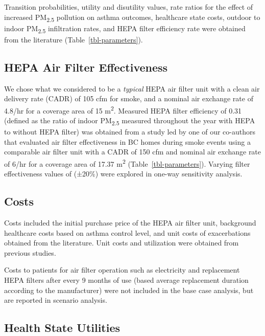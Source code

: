 \documentclass[
  number]{elsarticle}
\begin{document}
Transition probabilities, utility and disutility values, rate ratios for
the effect of increased PM\textsubscript{2.5} pollution on asthma
outcomes, healthcare state costs, outdoor to indoor
PM\textsubscript{2.5} infiltration rates, and HEPA filter efficiency
rate were obtained from the literature (Table~\ref{tbl-parameters}).

\hypertarget{hepa-air-filter-effectiveness}{%
\subsection{HEPA Air Filter
Effectiveness}\label{hepa-air-filter-effectiveness}}

We chose what we considered to be a \emph{typical} HEPA air filter unit
with a clean air delivery rate (CADR) of 105 cfm for smoke, and a
nominal air exchange rate of 4.8/hr for a coverage area of 15
m\textsuperscript{2}. Measured HEPA filter efficiency of 0.31 (defined
as the ratio of indoor PM\textsubscript{2.5} measured throughout the
year with HEPA to without HEPA filter) was obtained from a study led by
one of our co-authors that evaluated air filter effectiveness in BC
homes during smoke events \citep{Barn2008} using a comparable air filter
unit with a CADR of 150 cfm and nominal air exchange rate of 6/hr for a
coverage area of 17.37 m\textsuperscript{2}
(Table~\ref{tbl-parameters}). Varying filter effectiveness values of
(±20\%) were explored in one-way sensitivity analysis.

\hypertarget{costs}{%
\subsection{Costs}\label{costs}}

Costs included the initial purchase price of the HEPA air filter unit,
background healthcare costs based on asthma control level, and unit
costs of exacerbations obtained from the literature. Unit costs and
utilization were obtained from previous
studies\citep{sadatsafavi2021, bateman2018}.

Costs to patients for air filter operation such as electricity and
replacement HEPA filters after every 9 months of use (based average
replacement duration according to the manufacturer) were not included in
the base case analysis, but are reported in scenario analysis.

\hypertarget{health-state-utilities}{%
\subsection{Health State Utilities}\label{health-state-utilities}}
\end{document}
